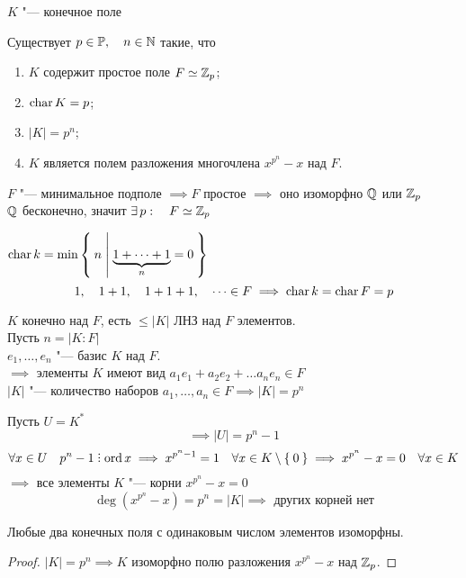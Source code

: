 \begin{theorem}
	$ K $ "--- конечное поле

	Существует $ p \in \mathbb{P}, \quad n \in \mathbb{N} $ такие, что
	\begin{enumerate}
		\item $ K $ содержит простое поле $ F \simeq \mathbb{Z}_p $;
		\item $ \operatorname{char} K = p $;
		\item $ |K| = p^n $;
		\item $ K $ является полем разложения многочлена $ x^{p^n} - x $ над $ F $.
	\end{enumerate}
\end{theorem}

\begin{eproof}
	\item $ F $ "--- минимальное подполе $ \implies F $ простое $ \implies $ оно изоморфно $ \mathbb{Q} $ или $ \mathbb{Z}_p $ \\
	$ \mathbb{Q} $ бесконечно, значит $ \exists\, p : \quad F \simeq \mathbb{Z}_p $
	\item $ \operatorname{char} k = \min\Set{n | \underbrace{1 + \dots + 1}_n = 0} $
	$$ 1, \quad 1 + 1, \quad 1 + 1 + 1, \quad \dots \in F \implies \operatorname{char} k = \operatorname{char} F = p $$
	\item $ K $ конечно над $ F $, \as есть $ \le |K| $ ЛНЗ над $ F $ элементов. \\
	Пусть $ n = |K : F| $ \\
	$ e_1, \dots, e_n $ "--- базис $ K $ над $ F $. \\
	$ \implies $ элементы $ K $ имеют вид $ a_1e_1 + a_2e_2 + \dots a_ne_n \in F $ \\
	$ |K| $ "--- количество наборов $ a_1, \dots, a_n \in F \implies |K| = p^n $
	\item Пусть $ U = K^* $ 
	$$ \implies |U| = p^n - 1 $$
	$$ \forall x \in U \quad p^n - 1 \divby \ord x \implies x^{p^n - 1} = 1 \quad \forall x \in K \setminus \set{0} \implies x^{p^n} - x = 0 \quad \forall x \in K $$
	$ \implies $ все элементы $ K $ "--- корни $ x^{p^n} - x = 0 $
	$$ \deg(x^{p^n} - x) = p^n = |K| \implies \text{ других корней нет} $$
\end{eproof}

\begin{implication}[единственность]
	Любые два конечных поля с одинаковым числом элементов изоморфны.
\end{implication}

\begin{proof}
	$ |K| = p^n \implies K $ изоморфно полю разложения $ x^{p^n} - x $ над $ \mathbb{Z}_p $.
\end{proof}

